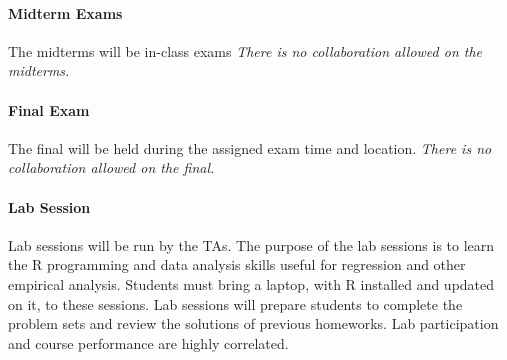 \documentclass[12pt]{article}
\begin{document}
			\paragraph{Midterm Exams} The midterms will be in-class exams {\it  There is no collaboration allowed on the midterms.}

			\paragraph{Final Exam}  The final will be held during the assigned exam time and location. {\it  There is no collaboration allowed on the final.}  
			
			\paragraph{Lab Session} Lab sessions will be run by the TAs. The purpose of the lab sessions is to learn the R programming and data analysis skills useful for regression and other empirical analysis. Students must bring a laptop, with R installed and updated on it, to these sessions. Lab sessions will prepare students to complete the problem sets and review the solutions of previous homeworks. Lab participation and course performance are highly correlated. 
			
\end{document}
